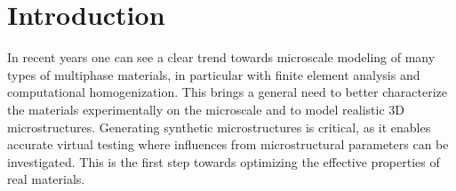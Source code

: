 \documentclass[3p,12pt]{elsarticle}
\begin{document}


\section{Introduction}


In recent years one can see a clear trend towards microscale modeling of many types of multiphase materials, in particular with finite element analysis and computational homogenization.
This brings a general need to better characterize the materials experimentally on the microscale and to model realistic 3D microstructures.
Generating synthetic microstructures is critical, as it enables accurate virtual testing where influences from microstructural parameters can be investigated.
This is the first step towards optimizing the effective properties of real materials.
\end{document}
